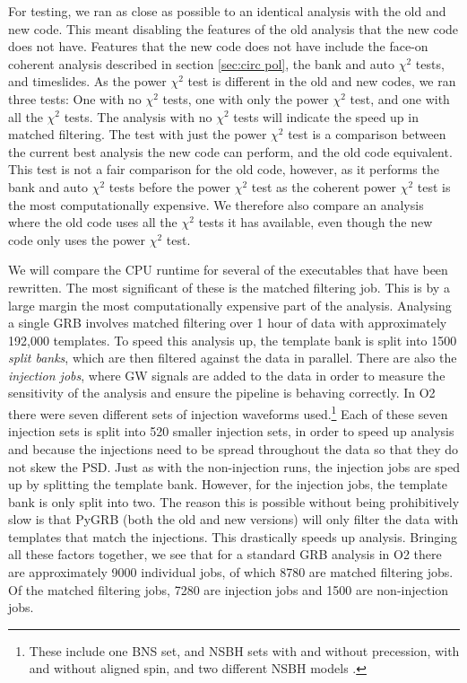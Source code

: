 \documentclass[11pt]{cuthesis}
\begin{document}
For testing, we ran as close as possible to an identical analysis with the old and new code. This meant disabling the features of the old analysis that the new code does not have. Features that the new code does not have include the face-on coherent analysis described in section \ref{sec:circ pol}, the bank and auto $\chi^2$ tests, and timeslides. As the power $\chi^2$ test is different in the old and new codes, we ran three tests: One with no $\chi^2$ tests, one with only the power $\chi^2$ test, and one with all the $\chi^2$ tests. The analysis with no $\chi^2$ tests will indicate the speed up in matched filtering. The test with just the power $\chi^2$ test is a comparison between the current best analysis the new code can perform, and the old code equivalent. This test is not a fair comparison for the old code, however, as it performs the bank and auto $\chi^2$ tests before the power $\chi^2$ test as the coherent power $\chi^2$ test is the most computationally expensive. We therefore also compare an analysis where the old code uses all the $\chi^2$ tests it has available, even though the new code only uses the power $\chi^2$ test. 

We will compare the CPU runtime for several of the executables that have been rewritten. The most significant of these is the matched filtering job. This is by a large margin the most computationally expensive part of the analysis. Analysing a single GRB involves matched filtering over 1 hour of data with approximately 192,000 templates. To speed this analysis up, the template bank is split into 1500 \textit{split banks}, which are then filtered against the data in parallel. There are also the \textit{injection jobs}, where GW signals are added to the data in order to measure the sensitivity of the analysis and ensure the pipeline is behaving correctly. In O2 there were seven different sets of injection waveforms used.\footnote{These include one BNS set, and NSBH sets with and without precession, with and without aligned spin, and two different NSBH models \cite{Buonanno:2002fy,Sturani:2010ju}.} Each of these seven injection sets is split into 520 smaller injection sets, in order to speed up analysis and because the injections need to be spread throughout the data so that they do not skew the PSD. Just as with the non-injection runs, the injection jobs are sped up by splitting the template bank. However, for the injection jobs, the template bank is only split into two. The reason this is possible without being prohibitively slow is that PyGRB (both the old and new versions) will only filter the data with templates that match the injections. This drastically speeds up analysis. Bringing all these factors together, we see that for a standard GRB analysis in O2 there are approximately 9000 individual jobs, of which 8780 are matched filtering jobs. Of the matched filtering jobs, 7280 are injection jobs and 1500 are non-injection jobs. 
\end{document}
